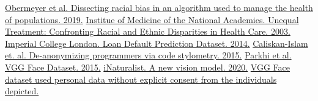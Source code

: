 \documentclass{article}
\theoremstyle{case}
\theoremstyle{definition}
\begin{document}
\begin{thebibliography}{9}
\href{https://doi.org/10.1126/science.aax2342}{Obermeyer et al. Dissecting racial bias in an algorithm used to manage the health of populations. 2019.}
\href{https://www.nap.edu/catalog/10260/unequal-treatment-confronting-racial-and-ethnic-disparities-in-health-care}{Institue of Medicine of the National Academies. Unequal Treatment: Confronting Racial and Ethnic Disparities in Health Care. 2003.}
\href{https://www.kaggle.com/c/loan-default-prediction/data}{Imperial College London. Loan Default Prediction Dataset. 2014.}
\href{https://dl.acm.org/doi/10.5555/2831143.2831160}{Caliskan-Islam et. al. De-anonymizing programmers via code stylometry. 2015.}
\href{https://www.robots.ox.ac.uk/~vgg/data/vgg_face/}{Parkhi et al. VGG Face Dataset. 2015.}
\href{https://www.inaturalist.org/blog/31806-a-new-vision-model}{iNaturalist. A new vision model. 2020.}
\href{ https://www.aiaaic.org/aiaaic-repository/ai-algorithmic-and-automation-incidents/vgg-face-dataset-used-personal-data-without-explicit-consent-from-the-indiv.} {VGG Face dataset used personal data without explicit consent from the individuals depicted.}

\end{thebibliography}
\end{document}
